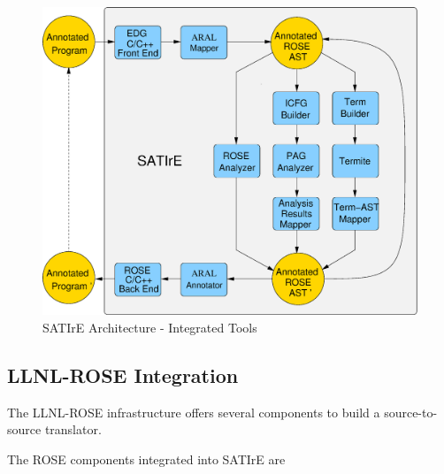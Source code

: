 \documentclass[a4paper,12pt]{report}
\newcommand{\outcomment}[1]{}
\begin{document}
\begin{figure}
\includegraphics[scale=0.37]{concretesatirearchitecture}
\caption{SATIrE Architecture - Integrated Tools}
\label{fig:concretesatirearchitecture}
\end{figure}

\subsection{LLNL-ROSE Integration}
\label{sec:ROSE}

The LLNL-ROSE infrastructure offers several components to build a
source-to-source translator. 
\outcomment{The ROSE Front End translates a C/C++
program to an object-oriented decorated abstract syntax tree. Several
different components can be used to build the midend of a translator:
to operate on the AST, a predefined traversal mechanism, a
restructuring mechanism, and an attribute evaluation mechanism can be
used to implement a transformation. A Back End is available for
unparsing the AST to a C++ program.
}
The ROSE components integrated into SATIrE are
\end{document}
